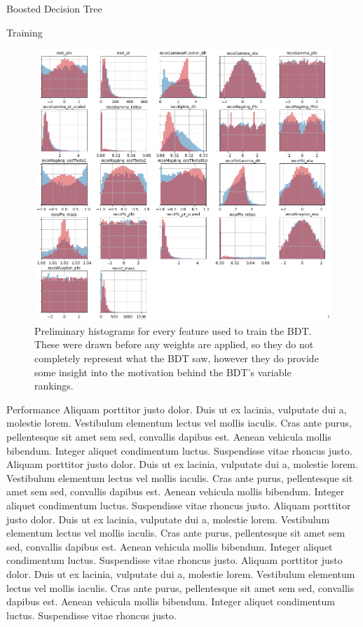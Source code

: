 \begin{section}{Boosted Decision Tree}
\begin{subsection}{Training}
\begin{figure}[htb]
\begin{center}
\includegraphics[width=.95\linewidth]{Dissertation/fig/bdt-training.png}
\end{center}
\caption{Preliminary histograms for every feature used to train the BDT. These were drawn before any weights are applied, so they do not completely represent what the BDT saw, however they do provide some insight into the motivation behind the BDT's variable rankings.}
\label{fig:bdt-training}
\end{figure}
\end{subsection}
\begin{subsection}{Performance}
Aliquam porttitor justo dolor. Duis ut ex lacinia, vulputate dui a, molestie lorem. Vestibulum elementum lectus vel mollis iaculis. Cras ante purus, pellentesque sit amet sem sed, convallis dapibus est. Aenean vehicula mollis bibendum. Integer aliquet condimentum luctus. Suspendisse vitae rhoncus justo. Aliquam porttitor justo dolor. Duis ut ex lacinia, vulputate dui a, molestie lorem. Vestibulum elementum lectus vel mollis iaculis. Cras ante purus, pellentesque sit amet sem sed, convallis dapibus est. Aenean vehicula mollis bibendum. Integer aliquet condimentum luctus. Suspendisse vitae rhoncus justo. Aliquam porttitor justo dolor. Duis ut ex lacinia, vulputate dui a, molestie lorem. Vestibulum elementum lectus vel mollis iaculis. Cras ante purus, pellentesque sit amet sem sed, convallis dapibus est. Aenean vehicula mollis bibendum. Integer aliquet condimentum luctus. Suspendisse vitae rhoncus justo. Aliquam porttitor justo dolor. Duis ut ex lacinia, vulputate dui a, molestie lorem. Vestibulum elementum lectus vel mollis iaculis. Cras ante purus, pellentesque sit amet sem sed, convallis dapibus est. Aenean vehicula mollis bibendum. Integer aliquet condimentum luctus. Suspendisse vitae rhoncus justo.


\end{subsection}
\end{section}
